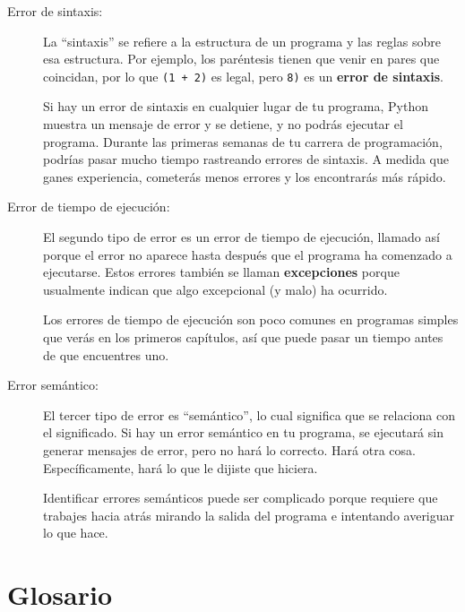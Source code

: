 \documentclass[10pt]{book}
\begin{document}
\begin{description}

\item[Error de sintaxis:] La ``sintaxis'' se refiere a la estructura de un programa
  y las reglas sobre esa estructura.  Por ejemplo, los paréntesis tienen
  que venir en pares que coincidan, por lo que {\tt (1 + 2)} es legal, pero {\tt 8)}
  es un {\bf error de sintaxis}.   

Si hay un error de sintaxis
en cualquier lugar de tu programa, Python muestra un mensaje de error y se detiene,
y no podrás ejecutar el programa.  Durante las primeras
semanas de tu carrera de programación, podrías pasar mucho
tiempo rastreando errores de sintaxis.  A medida que ganes experiencia,
cometerás menos errores y los encontrarás más rápido.


\item[Error de tiempo de ejecución:] El segundo tipo de error es un error de tiempo de ejecución,
  llamado así porque el error no aparece hasta después que el programa ha
  comenzado a ejecutarse.  Estos errores también se llaman {\bf excepciones}
  porque usualmente indican que algo excepcional (y malo)
  ha ocurrido.   
    

Los errores de tiempo de ejecución son poco comunes en programas simples que verás en los
primeros capítulos, así que puede pasar un tiempo antes de que encuentres uno.


\item[Error semántico:] El tercer tipo de error es ``semántico'', lo cual
  significa que se relaciona con el significado.  Si hay un error semántico en tu
  programa, se ejecutará sin generar mensajes de error, pero
  no hará lo correcto.  Hará otra cosa.  Específicamente,
  hará lo que le dijiste que hiciera.  
   

Identificar errores semánticos puede ser complicado porque requiere que trabajes
hacia atrás mirando la salida del programa e intentando averiguar
lo que hace.

\end{description}


\section{Glosario}
\end{document}
